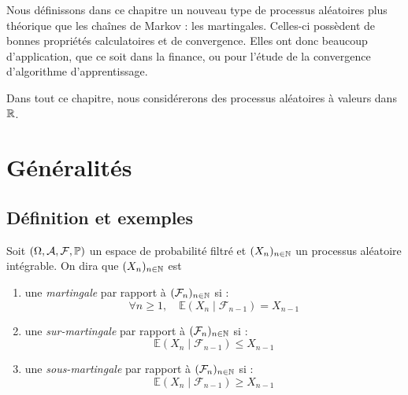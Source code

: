 
\minitoc


Nous définissons dans ce chapitre un nouveau type de processus aléatoires plus théorique 
que les chaînes de Markov : les martingales. 
Celles-ci possèdent de bonnes propriétés calculatoires et de convergence. Elles ont donc beaucoup 
d'application, que ce soit dans la finance, ou pour l'étude de la convergence d'algorithme 
d'apprentissage.

\medskip 

Dans tout ce chapitre, nous considérerons des processus aléatoires à valeurs dans $\mathbb{R}$. 


\section{Généralités}

\subsection{Définition et exemples}

\begin{definition}[Martingale]
    Soit $( \Omega, \mathcal{A}, \mathcal{F}, \mathbb{P})$ un espace de probabilité filtré 
    et $(X_n)_{n \in \mathbb{N}}$ un processus aléatoire intégrable. On dira que $(X_n)_{n \in \mathbb{N}}$ est 
    \begin{enumerate}[label=\roman*)]
        \item une \emph{martingale} par rapport à $ (\mathcal{F}_n)_{n \in \mathbb{N}}$ si : 
            \begin{equation}\label{definition:martingale}
                \forall n \geqslant 1, \quad \mathbb{E}(X_n \mid \mathcal{F}_{n-1}) = X_{n-1}
            \end{equation}
        \item une \emph{sur-martingale} par rapport à $ (\mathcal{F}_n)_{n \in \mathbb{N}}$ si : 
            \begin{equation}
                \mathbb{E}(X_n \mid \mathcal{F}_{n-1}) \leqslant X_{n-1}
            \end{equation}
        \item une \emph{sous-martingale} par rapport à $ (\mathcal{F}_n)_{n \in \mathbb{N}}$ si : 
            \begin{equation}
                \mathbb{E}(X_n \mid \mathcal{F}_{n-1}) \geqslant X_{n-1}
            \end{equation}
    \end{enumerate}
\end{definition}

